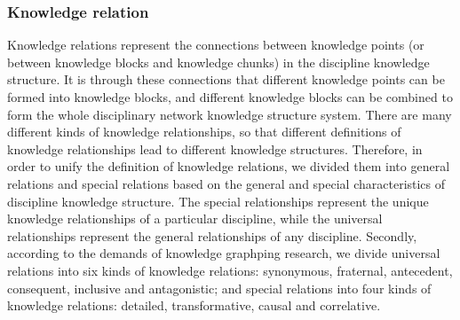\documentclass[11pt,en]{elegantpaper}
\begin{document}
\subsubsection{Knowledge relation}
Knowledge relations represent the connections between knowledge points (or between knowledge blocks and knowledge chunks) in the discipline knowledge structure. It is through these connections that different knowledge points can be formed into knowledge blocks, and different knowledge blocks can be combined to form the whole disciplinary network knowledge structure system. There are many different kinds of knowledge relationships, so that different definitions of knowledge relationships lead to different knowledge structures. Therefore, in order to unify the definition of knowledge relations, we divided them into general relations and special relations based on the general and special characteristics of discipline knowledge structure. The special relationships represent the unique knowledge relationships of a particular discipline, while the universal relationships represent the general relationships of any discipline. Secondly, according to the demands of knowledge graphping research, we divide universal relations into six kinds of knowledge relations: synonymous, fraternal, antecedent, consequent, inclusive and antagonistic; and special relations into four kinds of knowledge relations: detailed, transformative, causal and correlative.
\end{document}
